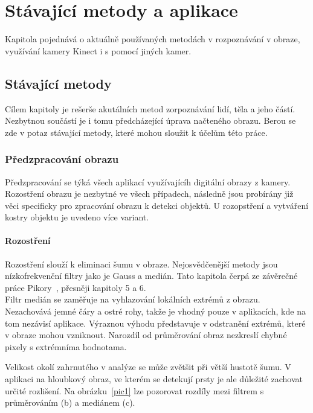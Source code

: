 
\textit{}\chapter{Stávající metody a aplikace}
Kapitola pojednává o aktuálně používaných metodách v rozpoznávání v obraze, využívání kamery Kinect i s pomocí jiných kamer.

\section{Stávající metody}
Cílem kapitoly je rešerše akutálních metod zorpoznávání lidí, těla a jeho částí. Nezbytnou součástí je i tomu předcházející úprava načteného obrazu. Berou se zde v potaz stávající metody, které mohou sloužit k účelům této práce.

\subsection{Předzpracování obrazu}
Předzpracování se týká všech aplikací využívajícíh digitální obrazy z kamery. Rozostření obrazu je nezbytné ve všech případech, následně jsou probírány již věci specificky pro zpracování obrazu k detekci objektů. U rozopstření a vytváření kostry objektu je uvedeno více variant.

\subsubsection{Rozostření}
Rozostření slouží k eliminaci šumu v obraze. Nejosvědčenější metody jsou nízkofrekvenční filtry jako je Gauss a medián. Tato kapitola čerpá ze závěrečné práce Pikory~\cite{15}, přesněji kapitoly 5 a 6.\\

Filtr medián se zaměřuje na vyhlazování lokálních extrémů z obrazu. Nezachovává jemné čáry a ostré rohy, takže je vhodný pouze v aplikacích, kde na tom nezávisí aplikace. Výraznou výhodu představuje v odstranění extrémů, které v obraze mohou vzniknout. Narozdíl od průměrování obraz nezkreslí chybné pixely s extrémníma hodnotama. %
 
Velikost okolí zahrnutého v analýze se může zvětšit při větší hustotě šumu. V aplikaci na hloubkový obraz, ve kterém se detekují prsty je ale důležité zachovat určité rozlišení. Na obrázku~\ref{pic1} lze pozorovat rozdíly mezi filtrem s průměrováním (b) a mediánem (c).\\


